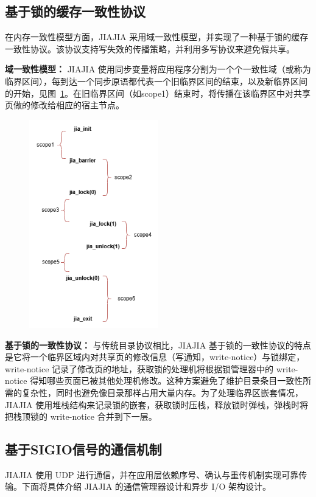 {\subsection{基于锁的缓存一致性协议}
在内存一致性模型方面，JIAJIA 采用域一致性模型，并实现了一种基于锁的缓存一致性协议。该协议支持写失效的传播策略，并利用多写协议来避免假共享。

\textbf{域一致性模型：} JIAJIA 使用同步变量将应用程序分割为一个个一致性域（或称为临界区间），每到达一个同步原语都代表一个旧临界区间的结束，以及新临界区间的开始，见图~\ref{fig:JIAJIA-scopes}。在旧临界区间（如scope1）结束时，将传播在该临界区中对共享页做的修改给相应的宿主节点。

    \begin{figure}[!htbp]
        \centering
        \includegraphics[width=0.50\textwidth]{Img/JIAJIA-scope.png}
        \label{fig:JIAJIA-scopes}
    \end{figure}

\textbf{基于锁的一致性协议：} 与传统目录协议相比，JIAJIA 基于锁的一致性协议的特点是它将一个临界区域内对共享页的修改信息（写通知，write-notice）与锁绑定，write-notice 记录了修改页的地址，获取锁的处理机将根据锁管理器中的 write-notice 得知哪些页面已被其他处理机修改。这种方案避免了维护目录条目一致性所需的复杂性，同时也避免像目录那样占用大量内存。为了处理临界区嵌套情况，JIAJIA 使用堆栈结构来记录锁的嵌套，获取锁时压栈，释放锁时弹栈，弹栈时将把栈顶锁的 write-notice 合并到下一层。

\subsection{基于SIGIO信号的通信机制}\label{chap:sdsm:sec:sigio}
JIAJIA 使用 UDP 进行通信，并在应用层依赖序号、确认与重传机制实现可靠传输。下面将具体介绍 JIAJIA 的通信管理器设计和异步 I/O 架构设计。

}
